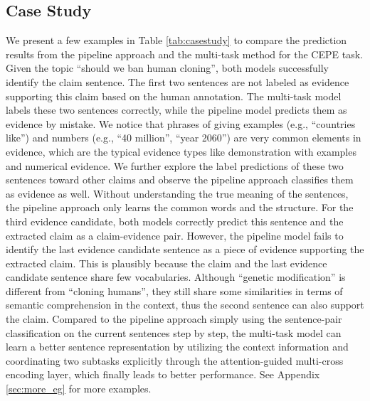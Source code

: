 \documentclass[11pt]{article}
\begin{document}
        


\subsection{Case Study}
We present a few examples in Table \ref{tab:casestudy} to compare the prediction results from the pipeline approach and the multi-task method for the CEPE task.
Given the topic ``should we ban human cloning'', both models successfully identify the claim sentence.
The first two sentences are not labeled as evidence supporting this claim based on the human annotation.
The multi-task model labels these two sentences correctly, while the pipeline model predicts them as evidence by mistake.
We notice that phrases of giving examples
(e.g., ``countries like'') and numbers (e.g., ``40 million'', ``year 2060'') are very common elements in evidence, which are the typical evidence types like demonstration with examples and numerical evidence.
We further explore the label predictions of these two sentences toward other claims and observe the pipeline approach classifies them as evidence as well.
Without understanding the true meaning of the sentences, the pipeline approach only learns the common words and the structure.
For the third evidence candidate, both models correctly predict this sentence and the extracted claim as a claim-evidence pair.
However, the pipeline model fails to identify the last evidence candidate sentence as a piece of evidence supporting the extracted claim.
This is plausibly because the claim and the last evidence candidate sentence share few vocabularies. 
Although ``genetic modification'' is different from ``cloning humans'', they still share some similarities in terms of semantic comprehension in the context, thus the second sentence can also support the claim.
Compared to the pipeline approach simply using the sentence-pair classification on the current sentences step by step, the multi-task model can learn a better sentence representation by utilizing the context information and coordinating two subtasks explicitly through the attention-guided multi-cross encoding layer, which finally leads to better performance.
See Appendix \ref{sec:more_eg} for more examples.
\end{document}
